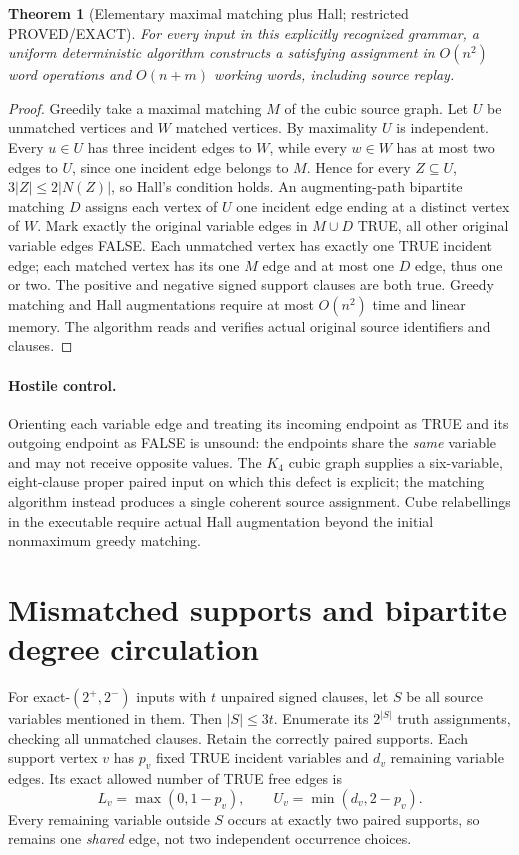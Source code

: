 \documentclass[10pt]{article}
\newtheorem{theorem}{Theorem}
\begin{document}
\begin{theorem}[Elementary maximal matching plus Hall; restricted PROVED/EXACT]
For every input in this explicitly recognized grammar, a uniform deterministic algorithm constructs a satisfying assignment in $O(n^2)$ word operations and $O(n+m)$ working words, including source replay.
\end{theorem}
\begin{proof}
Greedily take a maximal matching $M$ of the cubic source graph. Let $U$ be unmatched vertices and $W$ matched vertices. By maximality $U$ is independent. Every $u\in U$ has three incident edges to $W$, while every $w\in W$ has at most two edges to $U$, since one incident edge belongs to $M$. Hence for every $Z\subseteq U$, $3|Z|\le 2|N(Z)|$, so Hall's condition holds. An augmenting-path bipartite matching $D$ assigns each vertex of $U$ one incident edge ending at a distinct vertex of $W$. Mark exactly the original variable edges in $M\cup D$ TRUE, all other original variable edges FALSE. Each unmatched vertex has exactly one TRUE incident edge; each matched vertex has its one $M$ edge and at most one $D$ edge, thus one or two. The positive and negative signed support clauses are both true. Greedy matching and Hall augmentations require at most $O(n^2)$ time and linear memory. The algorithm reads and verifies actual original source identifiers and clauses.
\end{proof}

\paragraph{Hostile control.} Orienting each variable edge and treating its incoming endpoint as TRUE and its outgoing endpoint as FALSE is unsound: the endpoints share the \emph{same} variable and may not receive opposite values. The $K_4$ cubic graph supplies a six-variable, eight-clause proper paired input on which this defect is explicit; the matching algorithm instead produces a single coherent source assignment. Cube relabellings in the executable require actual Hall augmentation beyond the initial nonmaximum greedy matching.

\section{Mismatched supports and bipartite degree circulation}
For exact-$(2^+,2^-)$ inputs with $t$ unpaired signed clauses, let $S$ be all source variables mentioned in them. Then $|S|\le3t$. Enumerate its $2^{|S|}$ truth assignments, checking all unmatched clauses. Retain the correctly paired supports. Each support vertex $v$ has $p_v$ fixed TRUE incident variables and $d_v$ remaining variable edges. Its exact allowed number of TRUE free edges is
\[
 L_v=\max(0,1-p_v),\qquad U_v=\min(d_v,2-p_v).
\]
Every remaining variable outside $S$ occurs at exactly two paired supports, so remains one \emph{shared} edge, not two independent occurrence choices.
\end{document}
